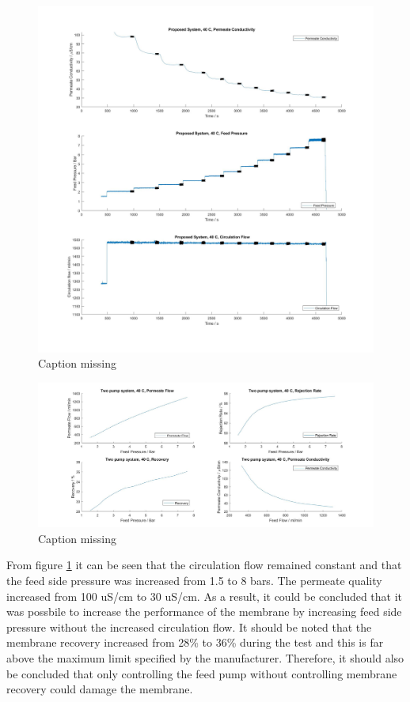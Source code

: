 \begin{figure}[H]
    \centering
    \includegraphics[width=1.1\textwidth]{FeedPumpIncrease40}
    \caption{Caption missing}
    \label{fig:FeedPumpIncrease40}
\end{figure}

\begin{figure}[H]
    \centering
    \includegraphics[width=1.1\textwidth]{FeedPumpIncrease40Key}
    \caption{Caption missing}
    \label{fig:FeedPumpIncrease40Key}
\end{figure}

From figure \ref{fig:FeedPumpIncrease40} it can be seen that the circulation flow remained constant and that the feed side pressure was increased from 1.5 to 8 bars. The permeate quality increased from 100 uS/cm to 30 uS/cm. As a result, it could be concluded that it was possbile to increase the performance of the membrane by increasing feed side pressure without the increased circulation flow. It should be noted that  the membrane recovery increased from 28\% to 36\% during the test and this is far above the maximum limit specified by the manufacturer. Therefore, it should also be concluded that only controlling the feed pump without controlling membrane recovery could damage the membrane. 

